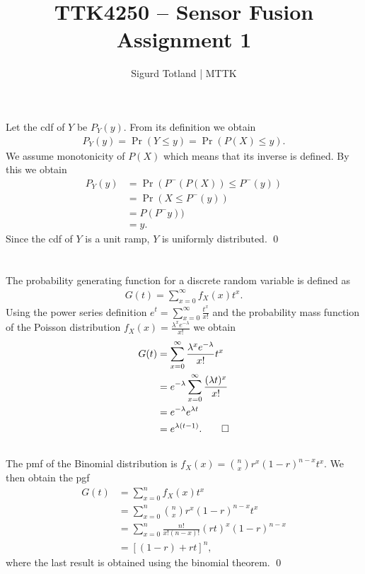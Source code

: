 \documentclass[]{article}
\title{\huge{TTK4250 – Sensor Fusion} \\ \LARGE{Assignment 1}}
\author{Sigurd Totland | MTTK}
\begin{document}
\maketitle

\section{}
Let the cdf of $Y$ be $P_Y(y)$. From its definition we obtain
\begin{align*}
P_Y(y) =\Pr(Y \leq y)=\Pr(P(X) \leq y).
\end{align*}
We assume monotonicity of $P(X)$ which means that its inverse is defined. By this we obtain
\begin{align*}
P_Y(y) &= \Pr(P^-(P(X)) \leq P^-(y)) \\
&= \Pr(X \leq P^-(y)) \\
&= P(P^-y)) \\
&= y.
\end{align*}
Since the cdf of $Y$ is a unit ramp, $Y$ is uniformly distributed. \qed

\section{}
\subsection{}
The probability generating function for a discrete random variable is defined as
\begin{align}
G(t) = \sum_{x=0}^{\infty}f_X(x)t^x.
\end{align}
Using the power series definition $e^t = \sum_{x=0}^{\infty}\frac{t^x}{x!}$ and the probability mass function of the Poisson distribution $f_X(x) = \frac{\lambda^x e^{-\lambda}}{x!}$ we obtain
\begin{align*}
G(t) &= \sum_{x=0}^{\infty}\frac{\lambda^x e^{-\lambda}}{x!}t^x \\
&= e^{-\lambda}\sum_{x=0}^{\infty}\frac{(\lambda t)^x}{x!} \\
&= e^{-\lambda}e^{\lambda t} \\
&= e^{\lambda(t - 1)}. \qed
\end{align*}

\subsection{}
The pmf of the Binomial distribution is $f_X(x)= \binom{n}{x}r^x(1-r)^{n-x}t^x$. We then obtain the pgf
\begin{align*}
G(t) &= \sum_{x=0}^{n}f_X(x)t^x \\
&= \sum_{x=0}^{n}\binom{n}{x}r^x(1-r)^{n-x}t^x \\
&= \sum_{x=0}^{n}\frac{n!}{x!(n-x)!}(rt)^x(1-r)^{n-x} \\
&= [(1-r) + rt]^n,
\end{align*}
where the last result is obtained using the binomial theorem. \qed
\end{document}
